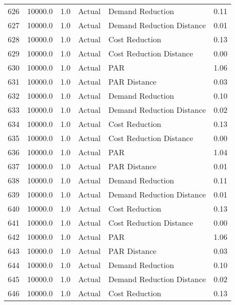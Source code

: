 \begin{longtable}{lrrllr}
626  &      10000.0 &     1.0 &         Actual &           Demand Reduction &   0.11 \\
627  &      10000.0 &     1.0 &         Actual &  Demand Reduction Distance &   0.01 \\
628  &      10000.0 &     1.0 &         Actual &             Cost Reduction &   0.13 \\
629  &      10000.0 &     1.0 &         Actual &    Cost Reduction Distance &   0.00 \\
630  &      10000.0 &     1.0 &         Actual &                        PAR &   1.06 \\
631  &      10000.0 &     1.0 &         Actual &               PAR Distance &   0.03 \\
632  &      10000.0 &     1.0 &         Actual &           Demand Reduction &   0.10 \\
633  &      10000.0 &     1.0 &         Actual &  Demand Reduction Distance &   0.02 \\
634  &      10000.0 &     1.0 &         Actual &             Cost Reduction &   0.13 \\
635  &      10000.0 &     1.0 &         Actual &    Cost Reduction Distance &   0.00 \\
636  &      10000.0 &     1.0 &         Actual &                        PAR &   1.04 \\
637  &      10000.0 &     1.0 &         Actual &               PAR Distance &   0.01 \\
638  &      10000.0 &     1.0 &         Actual &           Demand Reduction &   0.11 \\
639  &      10000.0 &     1.0 &         Actual &  Demand Reduction Distance &   0.01 \\
640  &      10000.0 &     1.0 &         Actual &             Cost Reduction &   0.13 \\
641  &      10000.0 &     1.0 &         Actual &    Cost Reduction Distance &   0.00 \\
642  &      10000.0 &     1.0 &         Actual &                        PAR &   1.06 \\
643  &      10000.0 &     1.0 &         Actual &               PAR Distance &   0.03 \\
644  &      10000.0 &     1.0 &         Actual &           Demand Reduction &   0.10 \\
645  &      10000.0 &     1.0 &         Actual &  Demand Reduction Distance &   0.02 \\
646  &      10000.0 &     1.0 &         Actual &             Cost Reduction &   0.13 \\

\end{longtable}
